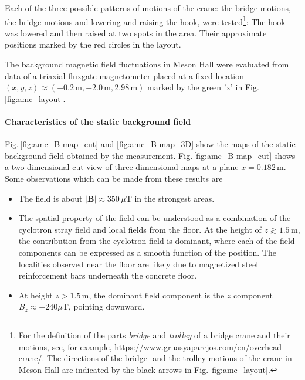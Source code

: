 Each of the three possible patterns of motions of the crane: the bridge motions, the bridge motions and lowering and raising the hook, were tested\footnote{For the definition of the parts \textit{bridge} and \textit{trolley} of a bridge crane and their motions, see, for example, \url{https://www.gruasyaparejos.com/en/overhead-crane/}. The directions of the bridge- and the trolley motions of the crane in Meson Hall are indicated by the black arrows in Fig.\,\ref{fig:amc_layout}.}: 
The hook was lowered and then raised at two spots in the area. Their approximate positions marked by the red circles in the layout. 

The background magnetic field fluctuations in Meson Hall were evaluated from data of a triaxial fluxgate magnetometer placed at a fixed location $(x,y,z) \approx (-0.2\,\mathrm{m}, -2.0\,\mathrm{m}, 2.98\,\mathrm{m})$ marked by the green 'x' in Fig.\,\ref{fig:amc_layout}.




\paragraph*{Characteristics of the static background field}
Fig.\,\ref{fig:amc_B-map_cut} and \ref{fig:amc_B-map_3D} show the maps of the 
static background field obtained by the measurement. Fig.\,\ref{fig:amc_B-map_cut} shows a two-dimensional cut view of three-dimensional maps at a plane $x=0.182\,\mathrm{m}$. Some observations which can be made from these results are 
\begin{itemize}

\item The field is about $|\mathbf{B}|\approx 350\,\mu$T in the strongest areas.
\item The spatial property of the field can be understood as a combination of the cyclotron stray field and local fields from the floor. At the height of $z \gtrsim 1.5\,\mathrm{m} $, the contribution from the cyclotron field is dominant, where each of the field components can be expressed as a smooth function of the position. The localities observed near the floor are likely due to magnetized steel reinforcement bars underneath the concrete floor.  
\item At height $z>1.5\,\mathrm{m}$, the dominant field component is the $z$ component $B_{z}\approx -240\mu$T, pointing downward.

\end{itemize}

